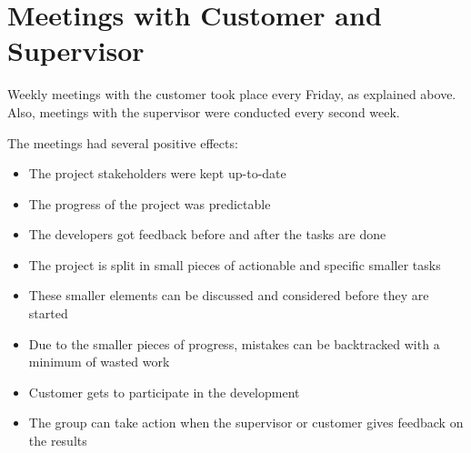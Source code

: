 \section{Meetings with Customer and Supervisor}
Weekly meetings with the customer took place every Friday, as explained above. Also, meetings with the supervisor were conducted every second week.

The meetings had several positive effects:
\begin{itemize}
\item The project stakeholders were kept up-to-date
\item The progress of the project was predictable
\item The developers got feedback before and after the tasks are done
\item The project is split in small pieces of actionable and specific smaller tasks
\item These smaller elements can be discussed and considered before they are started
\item Due to the smaller pieces of progress, mistakes can be backtracked with a minimum of wasted work
\item Customer gets to participate in the development
\item The group can take action when the supervisor or customer gives feedback on the results
\end{itemize}

